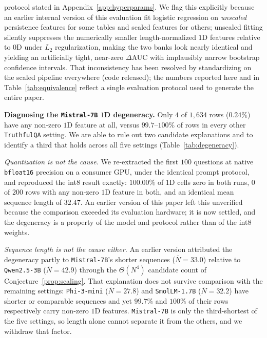 \documentclass{article}
\begin{document}
protocol stated in Appendix~\ref{app:hyperparams}. We flag this explicitly because an earlier internal version of this evaluation fit logistic regression on \emph{unscaled} persistence features for some tables and scaled features for others; unscaled fitting silently suppresses the numerically smaller length-normalized $1$D features relative to $0$D under $L_2$ regularization, making the two banks look nearly identical and yielding an artificially tight, near-zero $\Delta$AUC with implausibly narrow bootstrap confidence intervals. That inconsistency has been resolved by standardizing on the scaled pipeline everywhere (code released); the numbers reported here and in Table~\ref{tab:equivalence} reflect a single evaluation protocol used to generate the entire paper.

\textbf{Diagnosing the \texttt{Mistral-7B} $1$D degeneracy.} Only $4$ of $1{,}634$ rows ($0.24\%$) have any non-zero $1$D feature at all, versus $99.7$--$100\%$ of rows in every other \texttt{TruthfulQA} setting. We are able to rule out two candidate explanations and to identify a third that holds across all five settings (Table~\ref{tab:degeneracy}).

\emph{Quantization is not the cause.} We re-extracted the first $100$ questions at native \texttt{bfloat16} precision on a consumer GPU, under the identical prompt protocol, and reproduced the int8 result exactly: $100.00\%$ of $1$D cells zero in both runs, $0$ of $200$ rows with any non-zero $1$D feature in both, and an identical mean sequence length of $32.47$. An earlier version of this paper left this unverified because the comparison exceeded its evaluation hardware; it is now settled, and the degeneracy is a property of the model and protocol rather than of the int8 weights.

\emph{Sequence length is not the cause either.} An earlier version attributed the degeneracy partly to \texttt{Mistral-7B}'s shorter sequences ($\bar N{=}33.0$) relative to \texttt{Qwen2.5-3B} ($\bar N{=}42.9$) through the $\Theta(N^4)$ candidate count of Conjecture~\ref{prop:scaling}. That explanation does not survive comparison with the remaining settings: \texttt{Phi-3-mini} ($\bar N{=}27.8$) and \texttt{SmolLM-1.7B} ($\bar N{=}32.2$) have shorter or comparable sequences and yet $99.7\%$ and $100\%$ of their rows respectively carry non-zero $1$D features. \texttt{Mistral-7B} is only the third-shortest of the five settings, so length alone cannot separate it from the others, and we withdraw that factor.
\end{document}
